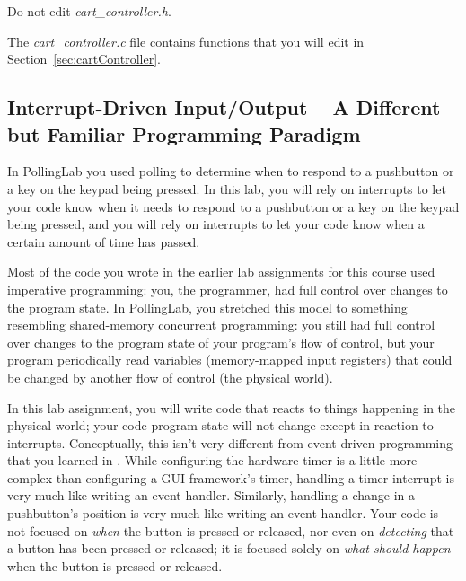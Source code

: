 Do not edit \textit{cart\_controller.h}.

The \textit{cart\_controller.c} file contains functions that you will edit in Section~\ref{sec:cartController}.

\subsection{Interrupt-Driven Input/Output -- A Different but Familiar Programming Paradigm}

In PollingLab you used polling to determine when to respond to a pushbutton or a key on the keypad being pressed.
In this lab, you will rely on interrupts to let your code know when it needs to respond to a pushbutton or a key on the keypad being pressed, and you will rely on interrupts to let your code know when a certain amount of time has passed.

\vspace{.25cm}

Most of the code you wrote in the earlier lab assignments for this course used imperative programming:
you, the programmer, had full control over changes to the program state.
In PollingLab, you stretched this model to something resembling shared-memory concurrent programming:
you still had full control over changes to the program state of your program's flow of control,
but your program periodically read variables (memory-mapped input registers) that could be changed by another flow of control (the physical world).

In this lab assignment, you will write code that reacts to things happening in the physical world;
your code program state will not change except in reaction to interrupts.
Conceptually, this isn't very different from event-driven programming that you learned in \cstwo.
While configuring the hardware timer is a little more complex than configuring a GUI framework's timer, handling a timer interrupt is very much like writing an  event handler.
Similarly, handling a change in a pushbutton's position is very much like writing an  event handler.
Your code is not focused on \textit{when} the button is pressed or released, nor even on \textit{detecting} that a button has been pressed or released;
it is focused solely on \textit{what should happen} when the button is pressed or released.